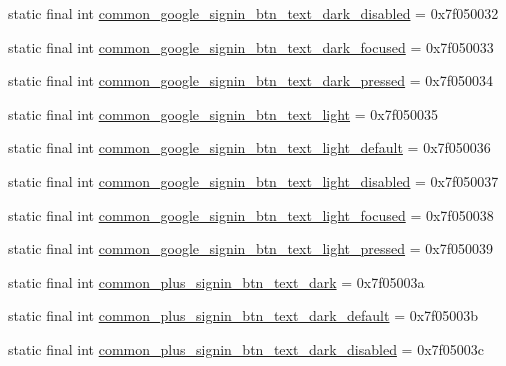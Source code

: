 \begin{DoxyCompactItemize}
static final int \mbox{\hyperlink{classcom_1_1google_1_1android_1_1gms_1_1R_1_1color_af19ad77e781339f981d823ba76bc1d0b}{common\+\_\+google\+\_\+signin\+\_\+btn\+\_\+text\+\_\+dark\+\_\+disabled}} = 0x7f050032
\item 
static final int \mbox{\hyperlink{classcom_1_1google_1_1android_1_1gms_1_1R_1_1color_a29ca37d62cacfe352f5acda7d2a65e15}{common\+\_\+google\+\_\+signin\+\_\+btn\+\_\+text\+\_\+dark\+\_\+focused}} = 0x7f050033
\item 
static final int \mbox{\hyperlink{classcom_1_1google_1_1android_1_1gms_1_1R_1_1color_a475e4207f214946299f4ae0a606e82ec}{common\+\_\+google\+\_\+signin\+\_\+btn\+\_\+text\+\_\+dark\+\_\+pressed}} = 0x7f050034
\item 
static final int \mbox{\hyperlink{classcom_1_1google_1_1android_1_1gms_1_1R_1_1color_aa7a5d8cc5595584f64c7bf76a51bb38a}{common\+\_\+google\+\_\+signin\+\_\+btn\+\_\+text\+\_\+light}} = 0x7f050035
\item 
static final int \mbox{\hyperlink{classcom_1_1google_1_1android_1_1gms_1_1R_1_1color_a3a67afc9d1938a4800645978f2709362}{common\+\_\+google\+\_\+signin\+\_\+btn\+\_\+text\+\_\+light\+\_\+default}} = 0x7f050036
\item 
static final int \mbox{\hyperlink{classcom_1_1google_1_1android_1_1gms_1_1R_1_1color_ad0fae09abc9e63b737fd28ba445ee9e2}{common\+\_\+google\+\_\+signin\+\_\+btn\+\_\+text\+\_\+light\+\_\+disabled}} = 0x7f050037
\item 
static final int \mbox{\hyperlink{classcom_1_1google_1_1android_1_1gms_1_1R_1_1color_a6aeb790b5afa7738c3aae066b3a0cffd}{common\+\_\+google\+\_\+signin\+\_\+btn\+\_\+text\+\_\+light\+\_\+focused}} = 0x7f050038
\item 
static final int \mbox{\hyperlink{classcom_1_1google_1_1android_1_1gms_1_1R_1_1color_a4b127de34a2f612b601231bb6f87d0ba}{common\+\_\+google\+\_\+signin\+\_\+btn\+\_\+text\+\_\+light\+\_\+pressed}} = 0x7f050039
\item 
static final int \mbox{\hyperlink{classcom_1_1google_1_1android_1_1gms_1_1R_1_1color_acc39257379cf734dc0e4315b92c958f9}{common\+\_\+plus\+\_\+signin\+\_\+btn\+\_\+text\+\_\+dark}} = 0x7f05003a
\item 
static final int \mbox{\hyperlink{classcom_1_1google_1_1android_1_1gms_1_1R_1_1color_aa6195b12d5ca71a181a66c621655cd9c}{common\+\_\+plus\+\_\+signin\+\_\+btn\+\_\+text\+\_\+dark\+\_\+default}} = 0x7f05003b
\item 
static final int \mbox{\hyperlink{classcom_1_1google_1_1android_1_1gms_1_1R_1_1color_a879c4f2390865881d79b2ffa5fcbbe99}{common\+\_\+plus\+\_\+signin\+\_\+btn\+\_\+text\+\_\+dark\+\_\+disabled}} = 0x7f05003c

\end{DoxyCompactItemize}
